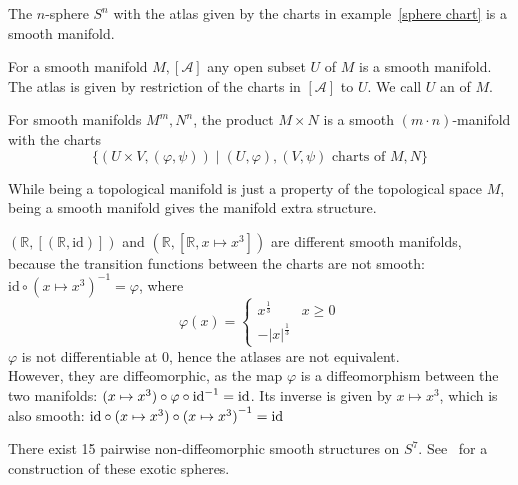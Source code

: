 \documentclass[a4paper,11pt]{article}
\begin{document}
\begin{example}[Spheres]
    The \(n\)-sphere \(S^n\) with the atlas given by the charts in example\ \ref{sphere chart} is a smooth manifold.
\end{example}

\begin{example}
    For a smooth manifold \(M,[\mathcal{A}]\) any open subset \(U\) of \(M\) is a smooth manifold. 
    The atlas is given by restriction of the charts in \([\mathcal{A}]\) to \(U\). 
    We call \(U\) an  of \(M\).
\end{example}

\begin{example}
    For smooth manifolds \(M^m,N^n\), the product \(M\times N\) is a smooth \((m\cdot n)\)-manifold with the charts\[\{(U\times V,(\varphi,\psi))\mid(U,\varphi),(V,\psi)\text{ charts of }M,N\}\]
\end{example}

\begin{remark}
    While being a topological manifold is just a property of the topological space \(M\), being a smooth manifold gives the manifold extra structure.
\end{remark}

\begin{example}
    \((\mathbb{R},[(\mathbb{R},\mathrm{id})])\) and \((\mathbb{R},[\mathbb{R},x\mapsto x^3])\) are different smooth manifolds, because the transition functions between the charts are not smooth: 
    \(\mathrm{id}\circ{(x\mapsto x^3)}^{-1}=\varphi\), where
    \[\varphi(x)=\begin{cases}x^{\frac13} & x\geq0\\ -\lvert x\rvert^{\frac13}\end{cases}\]
    \(\varphi\) is not differentiable at 0, hence the atlases are not equivalent.\\
    However, they are diffeomorphic, as the map \(\varphi\) is a diffeomorphism between the two manifolds: 
    \((x\mapsto x^3)\circ \varphi\circ \mathrm{id}^{-1}= \mathrm{id}\). Its inverse is given by \(x\mapsto x^3\), which is also smooth: \(\mathrm{id}\circ (x\mapsto x^3)\circ{(x\mapsto x^3)}^{-1}=\mathrm{id}\)
\end{example}


\begin{example}
    There exist 15 pairwise non-diffeomorphic smooth structures on \(S^7\). See\ \cite{kervaire} for a construction of these exotic spheres.
\end{example}
\end{document}
